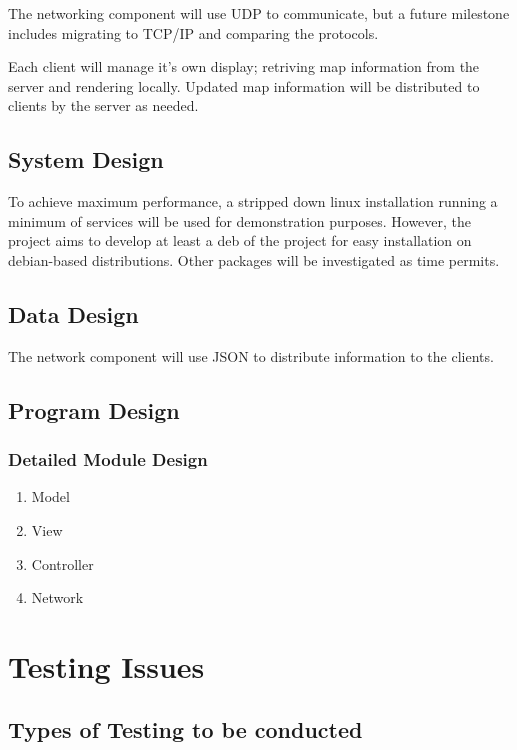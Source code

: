 \documentclass[a4paper]{article}
\begin{document}
The networking component will use UDP to communicate, but a future milestone
includes migrating to TCP/IP and comparing the protocols.

Each client will manage it's own display; retriving map information from the
server and rendering locally. Updated map information will be distributed to
clients by the server as needed.

\subsection{System Design}

To achieve maximum performance, a stripped down linux installation running
a minimum of services will be used for demonstration purposes. However, the
project aims to develop at least a deb of the project for easy installation on
debian-based distributions. Other packages will be investigated as time
permits.

\subsection{Data Design}

The network component will use JSON to distribute information to the clients.

\subsection{Program Design}

\subsubsection{Detailed Module Design}

\begin{enumerate}
  \item Model
  \item View
  \item Controller
  \item Network

\end{enumerate}

\section{Testing Issues}

\subsection{Types of Testing to be conducted}
\end{document}
